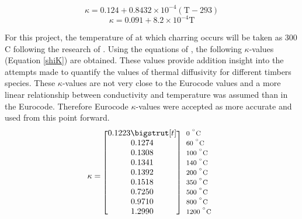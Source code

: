  \begin{equation}\label{softconeq}
 \kappa = 0.124 +0.8432 \times 10^{-4} (\text{T}-293) 
 \end{equation}
 \begin{equation}\label{charconeq}
 \kappa = 0.091 + 8.2 \times 10^{-4} \text{T}
 \end{equation}
 
 For this project, the temperature of at which charring occurs will be taken as 300 \textdegree C following the research of \citeauthor{Westhuyzen:2020}. 
 Using the equations of \citeauthor{Shi:2021}, the following $\kappa$-values (Equation \ref{shiK}) are obtained. 
 These values provide addition insight into the attempts made to quantify the values of thermal diffusivity for different timbers species.
These $\kappa$-values are not very close to the Eurocode values and a more linear relationship between conductivity and temperature  was assumed than in the Eurocode.
  Therefore Eurocode $\kappa$-values were accepted as more accurate and used from this point forward.
\begin{equation}\label{shiK}
  \kappa=
  \begin{blockarray}{*{1}{c} l}
    \begin{block}{[*{1}{c}]>{$\footnotesize}l<{$}}
     	0.1223\bigstrut[t] & 0 $^{^\circ} \text{C}$\\
		 0.1274& 60  $^{^\circ} \text{C}$\\ 
		0.1308 & 100 $^{^\circ} \text{C}$\\ 
		0.1341& 140 $^{^\circ} \text{C}$\\ 
		0.1392& 200 $^{^\circ} \text{C}$\\ 
		0.1518& 350 $^{^\circ} \text{C}$\\
		0.7250& 500 $^{^\circ} \text{C}$\\ 
		0.9710& 800 $^{^\circ} \text{C}$\\ 
		1.2990& 1200 $^{^\circ} \text{C}$\\
    \end{block}
  \end{blockarray}
\end{equation}
